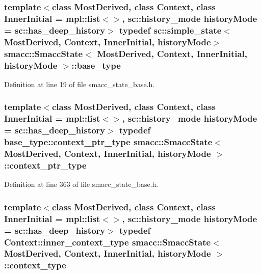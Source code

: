 \subsubsection[{\texorpdfstring{base\+\_\+type}{base_type}}]{\setlength{\rightskip}{0pt plus 5cm}template$<$class Most\+Derived, class Context, class Inner\+Initial = mpl\+::list$<$$>$, sc\+::history\+\_\+mode history\+Mode = sc\+::has\+\_\+deep\+\_\+history$>$ typedef sc\+::simple\+\_\+state$<$Most\+Derived, Context, Inner\+Initial, history\+Mode$>$ {\bf smacc\+::\+Smacc\+State}$<$ Most\+Derived, Context, Inner\+Initial, history\+Mode $>$\+::{\bf base\+\_\+type}\hspace{0.3cm}{\ttfamily [private]}}\hypertarget{classsmacc_1_1SmaccState_a68f547c6fe147554bbe607b6fcd8e40a}{}\label{classsmacc_1_1SmaccState_a68f547c6fe147554bbe607b6fcd8e40a}


Definition at line 19 of file smacc\+\_\+state\+\_\+base.\+h.

\subsubsection[{\texorpdfstring{context\+\_\+ptr\+\_\+type}{context_ptr_type}}]{\setlength{\rightskip}{0pt plus 5cm}template$<$class Most\+Derived, class Context, class Inner\+Initial = mpl\+::list$<$$>$, sc\+::history\+\_\+mode history\+Mode = sc\+::has\+\_\+deep\+\_\+history$>$ typedef base\+\_\+type\+::context\+\_\+ptr\+\_\+type {\bf smacc\+::\+Smacc\+State}$<$ Most\+Derived, Context, Inner\+Initial, history\+Mode $>$\+::{\bf context\+\_\+ptr\+\_\+type}}\hypertarget{classsmacc_1_1SmaccState_a0e15b77514301039f6bc093a9d3f6425}{}\label{classsmacc_1_1SmaccState_a0e15b77514301039f6bc093a9d3f6425}


Definition at line 363 of file smacc\+\_\+state\+\_\+base.\+h.

\subsubsection[{\texorpdfstring{context\+\_\+type}{context_type}}]{\setlength{\rightskip}{0pt plus 5cm}template$<$class Most\+Derived, class Context, class Inner\+Initial = mpl\+::list$<$$>$, sc\+::history\+\_\+mode history\+Mode = sc\+::has\+\_\+deep\+\_\+history$>$ typedef Context\+::inner\+\_\+context\+\_\+type {\bf smacc\+::\+Smacc\+State}$<$ Most\+Derived, Context, Inner\+Initial, history\+Mode $>$\+::{\bf context\+\_\+type}}\hypertarget{classsmacc_1_1SmaccState_a65c128d05dbcadbf817f41ba20b8fa01}{}\label{classsmacc_1_1SmaccState_a65c128d05dbcadbf817f41ba20b8fa01}


